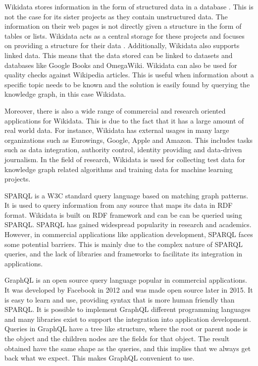 Wikidata stores information in the form of structured data in a database \cite{Tharani2021}. This is not the case for its sister projects as they contain unstructured data. The information on their web pages is not directly given a structure in the form of tables or lists. Wikidata acts as a central storage for these projects and focuses on providing a structure for their data \cite{Wikidata2014}. Additionally, Wikidata also supports linked data. This means that the data stored can be linked to datasets and databases like Google Books and OmegaWiki. Wikidata can also be used for quality checks against Wikipedia articles. This is useful when information about a specific topic needs to be known and the solution is easily found by querying the knowledge graph, in this case Wikidata.

Moreover, there is also a wide range of commercial and research oriented applications for Wikidata. This is due to the fact that it has a large amount of real world data. For instance, Wikidata has external usages in many large organizations such as Eurowings, Google, Apple and Amazon. This includes tasks such as data integration, authority control, identity providing and data-driven journalism. In the field of research, Wikidata is used for collecting test data for knowledge graph related algorithms and training data for machine learning projects.

SPARQL is a W3C standard query language based on matching graph patterns. It is used to query information from any source that maps its data in RDF format. Wikidata is built on RDF framework and can be can be queried using SPARQL. SPARQL has gained widespread popularity in research and academics. However, in commercial applications like application development, SPARQL faces some potential barriers. This is mainly due to the complex nature of SPARQL queries, and the lack of libraries and frameworks to facilitate its integration in applications. 

GraphQL is an open source query language popular in commercial applications. It was developed by Facebook in 2012 and was made open source later in 2015. It is easy to learn and use, providing syntax that is more human friendly than SPARQL. It is possible to implement GraphQL different programming languages and many libraries exist to support the integration into application development. Queries in GraphQL have a tree like structure, where the root or parent node is the object and the children nodes are the fields for that object. The result obtained have the same shape as the queries, and this implies that we always get back what we expect. This makes GraphQL convenient to use. 

